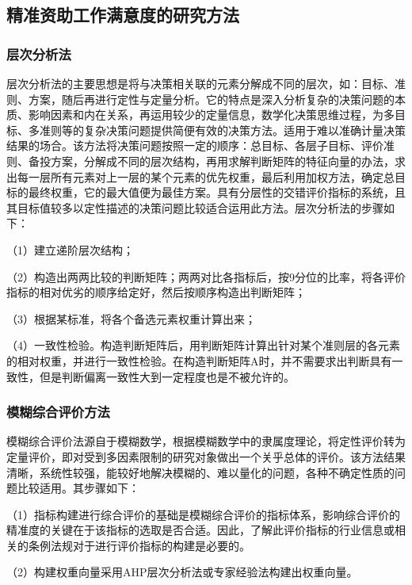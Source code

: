 \documentclass[UTF8,a4paper,12pt]{ctexart}  %
\begin{document}
\hypertarget{section-5}{%
\subsection{精准资助工作满意度的研究方法}\label{section-5}}

\hypertarget{section-6}{%
\subsubsection{层次分析法}\label{section-6}}

层次分析法的主要思想是将与决策相关联的元素分解成不同的层次，如：目标、准则、方案，随后再进行定性与定量分析。它的特点是深入分析复杂的决策问题的本质、影响因素和内在关系，再运用较少的定量信息，数学化决策思维过程，为多目标、多准则等的复杂决策问题提供简便有效的决策方法。适用于难以准确计量决策结果的场合。该方法将决策问题按照一定的顺序：总目标、各层子目标、评价准则、备投方案，分解成不同的层次结构，再用求解判断矩阵的特征向量的办法，求出每一层所有元素对上一层的某个元素的优先权重，最后利用加权方法，确定总目标的最终权重，它的最大值便为最佳方案。具有分层性的交错评价指标的系统，且其目标值较多以定性描述的决策问题比较适合运用此方法。层次分析法的步骤如下：

（1）建立递阶层次结构；

（2）构造出两两比较的判断矩阵；两两对比各指标后，按9分位的比率，将各评价指标的相对优劣的顺序给定好，然后按顺序构造出判断矩阵；

（3）根据某标准，将各个备选元素权重计算出来；

（4）一致性检验。构造判断矩阵后，用判断矩阵计算出针对某个准则层的各元素的相对权重，并进行一致性检验。在构造判断矩阵A时，并不需要求出判断具有一致性，但是判断偏离一致性大到一定程度也是不被允许的。

\hypertarget{section-7}{%
\subsubsection{模糊综合评价方法}\label{section-7}}

模糊综合评价法源自于模糊数学，根据模糊数学中的隶属度理论，将定性评价转为定量评价，即对受到多因素限制的研究对象做出一个关乎总体的评价。该方法结果清晰，系统性较强，能较好地解决模糊的、难以量化的问题，各种不确定性质的问题比较适用。其步骤如下：

（1）指标构建进行综合评价的基础是模糊综合评价的指标体系，影响综合评价的精准度的关键在于该指标的选取是否合适。因此，了解此评价指标的行业信息或相关的条例法规对于进行评价指标的构建是必要的。

（2）构建权重向量采用AHP层次分析法或专家经验法构建出权重向量。
\end{document}
